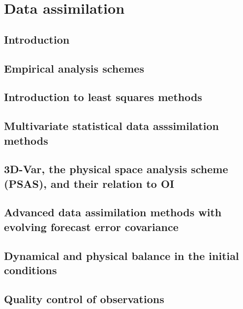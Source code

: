 
\section{Data assimilation}
\label{sec:kalnay:data_assimilation}

\subsection{Introduction}
\label{sub:data_assimilation:intro}

\subsection{Empirical analysis schemes}
\label{sub:data_assimilation:analysis}

\subsection{Introduction to least squares methods}
\label{sub:data_assimilation:squares}

\subsection{Multivariate statistical data asssimilation methods}
\label{sub:data_assimilation:multivar}

\subsection{3D-Var, the physical space analysis scheme (PSAS), and their relation to OI}
\label{sub:data_assimilation:3d-var}

\subsection{Advanced data assimilation methods with evolving forecast error covariance}
\label{sub:data_assimilation:advanced}

\subsection{Dynamical and physical balance in the initial conditions}
\label{sub:data_assimilation:balance}

\subsection{Quality control of observations}
\label{sub:data_assimilation:quality}



